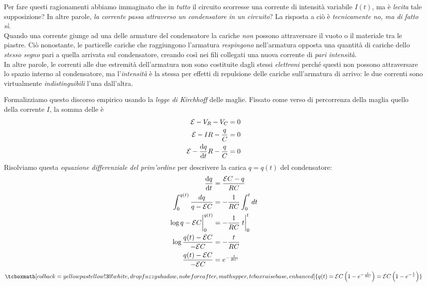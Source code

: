 \begin{observe}\label{correntevariabile}
	Per fare questi ragionamenti abbiamo immaginato che in \textit{tutto} il circuito scorresse una corrente di intensità variabile $I(t)$, ma è \textit{lecita} tale supposizione? In altre parole, \textit{la corrente passa attraverso un condensatore in un circuito}? La risposta a ciò è \textit{tecnicamente no, ma di fatto sì}.\\
	Quando una corrente giunge ad una delle armature del condensatore la cariche \textit{non} possono attraversare il vuoto o il materiale tra le piastre. Ciò nonostante, le particelle cariche che raggiungono l'armatura \textit{respingono} nell'armatura opposta una quantità di cariche dello \textit{stesso segno} pari a quella arrivata sul condensatore, creando così nei fili collegati una nuova corrente di \textit{pari intensità}.\\
	In altre parole, le correnti alle due estremità dell'armatura non sono costituite dagli stessi \textit{elettroni} perché questi non possono attraversare lo spazio interno al condensatore, ma l'\textit{intensità} è la stessa per effetti di repulsione delle cariche sull'armatura di arrivo: le due correnti sono virtualmente \textit{indistinguibili} l'una dall'altra.
\end{observe}
Formalizziamo questo discorso empirico usando la \textit{legge di Kirchhoff} delle maglie. Fissato come verso di percorrenza della maglia quello della corrente $I$, la somma delle \ddp è
\begin{align*}
	\mathcal{E}-V_R-V_C&=0\\
	\mathcal{E}-IR-\frac{q}{C}&=0\\
	\mathcal{E}-\dv{q}{t}R-\frac{q}{C}&=0
\end{align*}
Risolviamo questa \textit{equazione differenziale del prim'ordine} per descrivere la carica $q=q(t)$ del condensatore:
\begin{align*}
	\dv{q}{t}&=\frac{\mathcal{E}C-q}{RC}\\ \int_{0}^{q(t)}\frac{dq}{q-\mathcal{E}C}&=-\frac{1}{RC}\int_{0}^{t}dt\\
	\eval{\log{q-\mathcal{E}C}}_{0}^{q(t)}&=-\frac{1}{RC}\eval{t}_{0}^{t}\\
	\log{\frac{q(t)-\mathcal{E}C}{-\mathcal{E}C}}&=-\frac{t}{RC}\\
	\frac{q(t)-\mathcal{E}C}{-\mathcal{E}C}&=e^{-\frac{t}{RC}}
\end{align*}
\begin{equation}
	\tcboxmath[colback=yellowpastellow!30!white,drop fuzzy shadow, nobeforeafter, math upper, tcbox raise base, enhanced]{q(t)=\mathcal{E}C\left(1-e^{-\frac{t}{RC}}\right)=\mathcal{E}C\left(1-e^{-\frac{t}{\tau}}\right)}
\end{equation}
